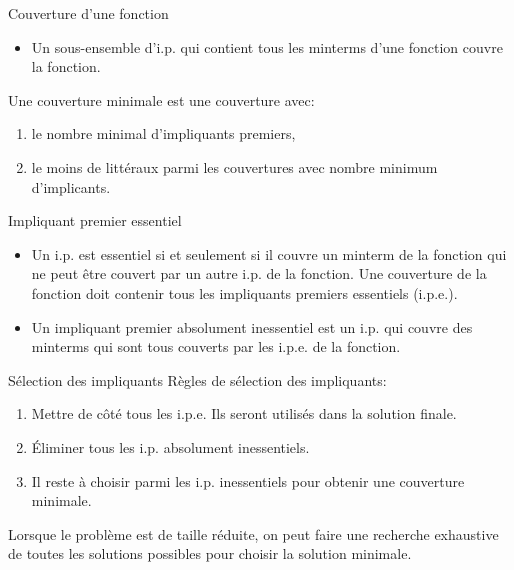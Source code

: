 \documentclass[presentation]{beamer}
\begin{document}
\begin{frame}[label={sec:orga593472}]{Couverture d'une fonction}
\begin{itemize}
\item Un sous-ensemble d'i.p. qui contient tous les minterms d'une fonction \alert{couvre} la fonction.
\end{itemize}

Une \alert{couverture minimale} est une couverture avec:

\begin{enumerate}
\item le nombre minimal d'impliquants premiers,

\item le moins de littéraux parmi les couvertures avec nombre minimum
d'implicants.
\end{enumerate}
\end{frame}

\begin{frame}[label={sec:org7deb2fa}]{Impliquant premier essentiel}
\begin{itemize}
\item Un i.p. est \alert{essentiel} si et seulement si il couvre un minterm de la fonction qui ne peut être couvert par un autre i.p. de la fonction.  Une couverture de la fonction \alert{doit} contenir tous les impliquants premiers essentiels (i.p.e.).

\item Un \alert{impliquant premier absolument inessentiel} est un i.p. qui couvre des minterms qui sont tous couverts par les i.p.e. de la fonction.
\end{itemize}
\end{frame}

\begin{frame}[label={sec:org74dc25c}]{Sélection des impliquants}
Règles de sélection des impliquants:

\begin{enumerate}
\item Mettre de côté tous les i.p.e. Ils seront utilisés dans la solution
finale.

\item Éliminer tous les i.p. absolument inessentiels.

\item Il reste à choisir parmi les i.p. inessentiels pour obtenir une
couverture minimale.
\end{enumerate}

Lorsque le problème est de taille réduite, on peut faire une recherche exhaustive de toutes les solutions possibles pour choisir la solution minimale.
\end{frame}
\end{document}
